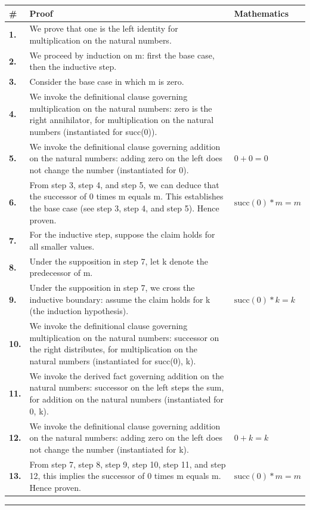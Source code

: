 \documentclass[11pt]{article}
\theoremstyle{definition}
\begin{document}
\begin{tabular}{@{} >{\raggedright\arraybackslash}p{} >{\raggedright\arraybackslash}p{} >{\raggedleft\arraybackslash}p{} @{}}
\textbf{\#} & \textbf{Proof} & \textbf{Mathematics} \\
\midrule
\textbf{1.} & We prove that one is the left identity for multiplication on the natural numbers. & \\[0.45em]
\textbf{2.} & We proceed by induction on m: first the base case, then the inductive step. & \\[0.45em]
\textbf{3.} & Consider the base case in which m is zero. & \\[0.45em]
\textbf{4.} & We invoke the definitional clause governing multiplication on the natural numbers: zero is the right annihilator, for multiplication on the natural numbers (instantiated for succ(0)). & \\[0.45em]
\textbf{5.} & We invoke the definitional clause governing addition on the natural numbers: adding zero on the left does not change the number (instantiated for 0). & $\displaystyle 0 + 0 = 0$ \\[0.45em]
\textbf{6.} & From step 3, step 4, and step 5, we can deduce that the successor of 0 times m equals m. This establishes the base case (see step 3, step 4, and step 5). Hence proven. & $\displaystyle \mathrm{succ}(0) * m = m$ \\[0.45em]
\textbf{7.} & For the inductive step, suppose the claim holds for all smaller values. & \\[0.45em]
\textbf{8.} & Under the supposition in step 7, let k denote the predecessor of m. & \\[0.45em]
\textbf{9.} & Under the supposition in step 7, we cross the inductive boundary: assume the claim holds for k (the induction hypothesis). & $\displaystyle \mathrm{succ}(0) * k = k$ \\[0.45em]
\textbf{10.} & We invoke the definitional clause governing multiplication on the natural numbers: successor on the right distributes, for multiplication on the natural numbers (instantiated for succ(0), k). & \\[0.45em]
\textbf{11.} & We invoke the derived fact governing addition on the natural numbers: successor on the left steps the sum, for addition on the natural numbers (instantiated for 0, k). & \\[0.45em]
\textbf{12.} & We invoke the definitional clause governing addition on the natural numbers: adding zero on the left does not change the number (instantiated for k). & $\displaystyle 0 + k = k$ \\[0.45em]
\textbf{13.} & From step 7, step 8, step 9, step 10, step 11, and step 12, this implies the successor of 0 times m equals m. Hence proven. & $\displaystyle \mathrm{succ}(0) * m = m$ \\[0.45em]
\bottomrule
\end{tabular}
\label{thm:Nat-multiplication-one_is_the_left_identity}
\par\medskip\hrule
\end{document}
